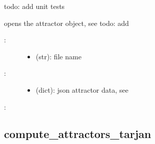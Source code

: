 \documentclass[letterpaper,10pt,english]{sphinxmanual}
\begin{document}
\begin{fulllineitems}
\label{\detokenize{Attractors:PyBoolNet.Attractors.open_json}}
todo: add unit tests

opens the attractor object, see todo: add 
\begin{description}
\item[{:}] \leavevmode\begin{itemize}
\item {} 
 (str): file name

\end{itemize}

\item[{:}] \leavevmode\begin{itemize}
\item {} 
 (dict): json attractor data, see {\hyperref[\detokenize{Attractors:attractors-compute-json}]{}}

\end{itemize}

\end{description}

:

\begin{sphinxVerbatim}[commandchars=\\\{\}]
  
\end{sphinxVerbatim}

\end{fulllineitems}



\subsection{compute\_attractors\_tarjan}
\label{\detokenize{Attractors:id2}}\label{\detokenize{Attractors:compute-attractors-tarjan}}
\end{document}
